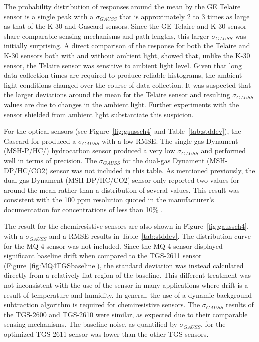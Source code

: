 \documentclass[sensors,article,submit,moreauthors,pdftex]{Definitions/mdpi}
\begin{document}
			
			The probability distribution of responses around the mean by the GE Telaire sensor is a single peak with a $\sigma_{GAUSS}$ that is approximately 2 to 3 times as large as that of the K-30 and Gascard sensors.
			Since the GE Telaire and K-30 sensor share comparable sensing mechanisms and path lengths, this larger $\sigma_{GAUSS}$ was initially surprising.
			A direct comparison of the response for both the Telaire and K-30 sensors both with and without ambient light, showed that, unlike the K-30 sensor, the Telaire sensor was sensitive to ambient light level.
			Given that long data collection times are required to produce reliable histograms, the ambient light conditions changed over the course of data collection.
			It was suspected that the larger deviations around the mean for the Telaire sensor and resulting $\sigma_{GAUSS}$ values are due to changes in the ambient light.
			Further experiments with the sensor shielded from ambient light substantiate this suspicion.
			
			
			For the optical  sensors (see Figure~\ref{fig:gaussch4} and Table~\ref{tab:stddev}), the Gascard for  produced a $\sigma_{GAUSS}$ with a low RMSE.
			The single gas Dynament (MSH-P/HC/) hydrocarbon sensor produced a very low $\sigma_{GAUSS}$ and performed well in terms of precision.
			The $\sigma_{GAUSS}$ for the dual-gas Dynament (MSH-DP/HC/CO2) sensor was not included in this table.
			As mentioned previously, the dual-gas Dynament (MSH-DP/HC/CO2) sensor only reported two values for  around the mean rather than a distribution of several values.
			This result was consistent with the 100 ppm resolution quoted in the manufacturer's documentation for concentrations of less than 10\% .
			

			The result for the chemiresistive  sensors are also shown in Figure~\ref{fig:gaussch4}, with a $\sigma_{GAUSS}$ and a RMSE results in Table~\ref{tab:stddev}.
			The distribution curve for the MQ-4 sensor was not included.
			Since the MQ-4 sensor displayed significant baseline drift when compared to the TGS-2611 sensor (Figure~\ref{fig:MQ4TGSbaseline}), the standard deviation was instead calculated directly from a relatively flat region of the baseline.
			This different treatment was not inconsistent with the use of the sensor in many applications where drift is a result of temperature and humidity.
			In general, the use of a dynamic background subtraction algorithm is required for chemiresistive sensors.
			The $\sigma_{GAUSS}$ results of the TGS-2600 and TGS-2610 were similar, as expected due to their comparable sensing mechanisms.
			The baseline noise, as quantified by $\sigma_{GAUSS}$, for the  optimized TGS-2611 sensor was lower than the other TGS sensors.
			
\end{document}
